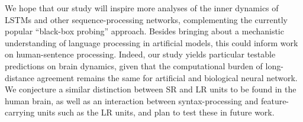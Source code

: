 We hope that our study will inspire more analyses of the inner dynamics of LSTMs and other sequence-processing networks, complementing the currently popular ``black-box probing'' approach. Besides bringing about a mechanistic understanding of language processing in artificial models, this could inform work on human-sentence processing. Indeed, our study yields particular testable predictions on brain dynamics, given that the computational burden of long-distance agreement remains the same for artificial and biological neural network. We conjecture a similar distinction between SR and LR units to be found in the human brain, as well as an interaction between syntax-processing and feature-carrying units such as the LR units, and plan to test these in future work.